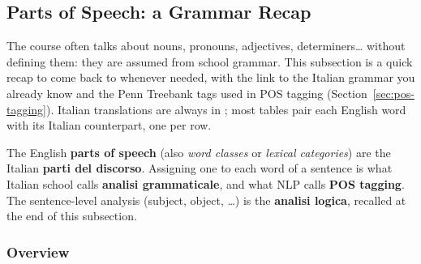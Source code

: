 \subsection{Parts of Speech: a Grammar Recap}
\label{sec:parts-of-speech}
\notinslides

The course often talks about nouns, pronouns, adjectives, determiners\ldots{} without
defining them: they are assumed from school grammar. This subsection is a quick recap to
come back to whenever needed, with the link to the Italian grammar you already know and
the Penn Treebank tags used in POS tagging (Section~\ref{sec:pos-tagging}). Italian
translations are always in ; most tables pair each English word with its
Italian counterpart, one per row.

\begin{nbintuition}
The English \textbf{parts of speech} (also \emph{word classes} or \emph{lexical
categories}) are the Italian \textbf{parti del discorso}. Assigning one to each word of a
sentence is what Italian school calls \textbf{analisi grammaticale}, and what NLP calls
\textbf{POS tagging}. The sentence-level analysis (subject, object, \ldots) is the
\textbf{analisi logica}, recalled at the end of this subsection.
\end{nbintuition}

\subsubsection{Overview}
\notinslides

